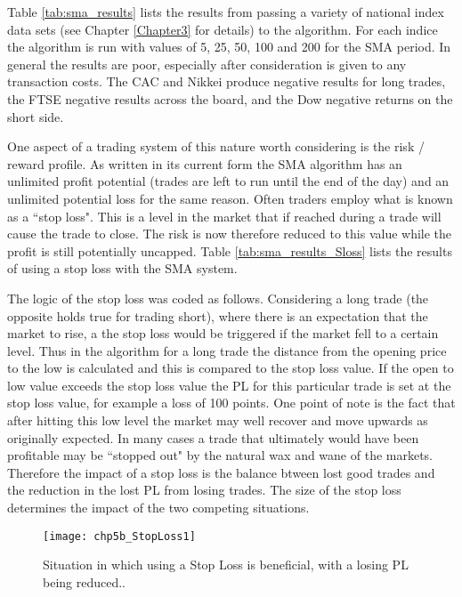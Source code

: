 Table \ref{tab:sma_results} lists the results from passing a variety of national index data sets (see Chapter \ref{Chapter3} for details) to the algorithm. For each indice the algorithm is run with values of 5, 25, 50, 100 and 200 for the SMA period. In general the results are poor, especially after consideration is given to any transaction costs. The CAC and Nikkei produce negative results for long trades, the FTSE negative results across the board, and the Dow negative returns on the short side.




One aspect of a trading system of this nature worth considering is the risk / reward profile. As written in its current form the SMA algorithm has an unlimited profit potential (trades are left to run until the end of the day) and an unlimited potential loss for the same reason. Often traders employ what is known as a \textquotedblleft stop loss". This is a level in the market that if reached during a trade will cause the trade to close. The risk is now therefore reduced to this value while the profit is still potentially uncapped. Table \ref{tab:sma_results_Sloss} lists the results of using a stop loss with the SMA system.

The logic of the stop loss was coded as follows. Considering a long trade (the opposite holds true for trading short), where there is an expectation that the market to rise, a the stop loss would be triggered if the market fell to a certain  level. Thus in the algorithm for a long trade the distance from the opening price to the low is calculated and this is compared to the stop loss value. If the open to low value exceeds the stop loss value the PL for this particular trade is set at the stop loss value, for example a loss of 100 points. One point of note is the fact that after hitting this low level the market may well recover and move upwards as originally expected. In many cases a trade that ultimately would have been profitable may be \textquotedblleft stopped out" by the natural wax and wane of the markets. Therefore the impact of a stop loss is the balance btween lost good trades and the reduction in the lost PL from losing trades. The size of the stop loss determines the impact of the two competing situations.

\begin{figure}[tbph]
\centering
\texttt{[image: chp5b\_StopLoss1]}
\caption[ Stop Loss.]{Situation in which using a Stop Loss is beneficial, with a losing PL being reduced..}
\label{fig:chp5:sloss1}
\end{figure}

